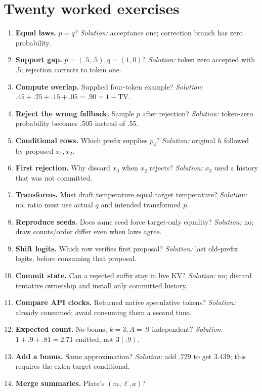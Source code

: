 \section{Twenty worked exercises}
\label{evod38:exercises}
\begin{enumerate}
\item \textbf{Equal laws.} $p=q$? \emph{Solution:} acceptance one;
correction branch has zero probability.
\item \textbf{Support gap.} $p=(.5,.5),q=(1,0)$?
\emph{Solution:} token zero accepted with .5; rejection corrects to token one.
\item \textbf{Compute overlap.} Supplied four-token example?
\emph{Solution:} $.45+.25+.15+.05=.90=1-\mathrm{TV}$.
\item \textbf{Reject the wrong fallback.} Sample $p$ after rejection?
\emph{Solution:} token-zero probability becomes .505 instead of .55.
\item \textbf{Conditional rows.} Which prefix supplies $p_3$?
\emph{Solution:} original $h$ followed by proposed $x_1,x_2$.
\item \textbf{First rejection.} Why discard $x_3$ when $x_2$ rejects?
\emph{Solution:} $x_3$ used a history that was not committed.
\item \textbf{Transforms.} Must draft temperature equal target temperature?
\emph{Solution:} no; ratio must use actual $q$ and intended transformed $p$.
\item \textbf{Reproduce seeds.} Does same seed force target-only equality?
\emph{Solution:} no; draw counts/order differ even when laws agree.
\item \textbf{Shift logits.} Which row verifies first proposal?
\emph{Solution:} last old-prefix logits, before consuming that proposal.
\item \textbf{Commit state.} Can a rejected suffix stay in live KV?
\emph{Solution:} no; discard tentative ownership and install only committed history.
\item \textbf{Compare API clocks.} Returned native speculative tokens?
\emph{Solution:} already consumed; avoid consuming them a second time.
\item \textbf{Expected count.} No bonus, $k=3,A=.9$ independent?
\emph{Solution:} $1+.9+.81=2.71$ emitted, not $3(.9)$.
\item \textbf{Add a bonus.} Same approximation? \emph{Solution:}
add $.729$ to get 3.439; this requires the extra target conditional.
\item \textbf{Merge summaries.} Plate's $(m,\ell,a)$?

\end{enumerate}
